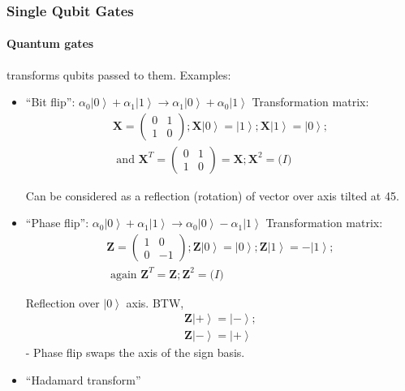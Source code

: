 \documentclass{scrartcl}
\newcommand{\ket}[1]{\left| #1 \right>} %
\begin{document}
\subsubsection{Single Qubit Gates}
\label{sec:5-4}

\paragraph{Quantum gates} transforms qubits passed to them. Examples:
\begin{itemize}
\item ``Bit flip'': $\alpha_0 \ket0 + \alpha_1 \ket1 \to \alpha_1 \ket0 +
  \alpha_0 \ket1 $ Transformation matrix:
  \begin{gather*}
    \mathbf{X} = \left( \begin{array}{cc} 0 & 1 \\ 1 & 0 \end{array} \right);
    \mathbf{X} \ket0 = \ket1; \mathbf{X} \ket1 = \ket0; \\
    \mbox{ and } \mathbf{X}^T = \left( \begin{array}{cc} 0 & 1 \\ 1 &
        0 \end{array} \right) = \mathbf{X}; \mathbf{X}^2 = \mathbf(I)
  \end{gather*}

  Can be considered as a reflection (rotation) of vector over axis tilted at
  45\textdegree.

\item ``Phase flip'': $\alpha_0 \ket0 + \alpha_1 \ket1 \to \alpha_0 \ket0 -
  \alpha_1 \ket1 $ Transformation matrix:
  \begin{gather*}
    \mathbf{Z} = \left( \begin{array}{cc} 1 & 0 \\ 0 & -1 \end{array} \right);
    \mathbf{Z} \ket0 = \ket0; \mathbf{Z} \ket1 = - \ket1; \\
    \mbox{ again } \mathbf{Z}^T = \mathbf{Z}; \mathbf{Z}^2 = \mathbf(I)
  \end{gather*}

  Reflection over $\ket0$ axis. BTW, \begin{gather*} \mathbf{Z} \ket+ = \ket-;
    \\ \mathbf{Z} \ket- = \ket+
  \end{gather*} - Phase flip swaps the axis of the sign basis.

\item ``Hadamard transform''


\end{itemize}
\end{document}

